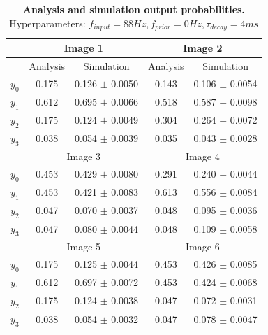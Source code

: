 \begin{table}[]
\centering
\label{tab:1D_88_0_4}
\small
\tabcolsep=0.11cm
\begin{tabular}{|c|cc|cc|}
\hline
                       & \multicolumn{2}{c|}{Image 1}                       & \multicolumn{2}{c|}{Image 2}                       \\ \hline
                       & \multicolumn{1}{c|}{Analysis} & Simulation         & \multicolumn{1}{c|}{Analysis} & Simulation         \\ \hline
$y_0$                  & \multicolumn{1}{c|}{0.175}    & 0.126 $\pm$ 0.0050 & \multicolumn{1}{c|}{0.143}    & 0.106 $\pm$ 0.0054 \\ \hline
$y_1$                  & \multicolumn{1}{c|}{0.612}    & 0.695 $\pm$ 0.0066 & \multicolumn{1}{c|}{0.518}    & 0.587 $\pm$ 0.0098 \\ \hline
$y_2$                  & \multicolumn{1}{c|}{0.175}    & 0.124 $\pm$ 0.0049 & \multicolumn{1}{c|}{0.304}    & 0.264 $\pm$ 0.0072 \\ \hline
$y_3$                  & \multicolumn{1}{c|}{0.038}    & 0.054 $\pm$ 0.0039 & \multicolumn{1}{c|}{0.035}    & 0.043 $\pm$ 0.0028 \\ \hline
                       & \multicolumn{2}{c|}{Image 3}                       & \multicolumn{2}{c|}{Image 4}                       \\ \hline
$y_0$                  & \multicolumn{1}{c|}{0.453}    & 0.429 $\pm$ 0.0080 & \multicolumn{1}{c|}{0.291}    & 0.240 $\pm$ 0.0044 \\ \hline
$y_1$                  & \multicolumn{1}{c|}{0.453}    & 0.421 $\pm$ 0.0083 & \multicolumn{1}{c|}{0.613}    & 0.556 $\pm$ 0.0084 \\ \hline
$y_2$                  & \multicolumn{1}{c|}{0.047}    & 0.070 $\pm$ 0.0037 & \multicolumn{1}{c|}{0.048}    & 0.095 $\pm$ 0.0036 \\ \hline
$y_3$                  & \multicolumn{1}{c|}{0.047}    & 0.080 $\pm$ 0.0044 & \multicolumn{1}{c|}{0.048}    & 0.109 $\pm$ 0.0058 \\ \hline
						& \multicolumn{2}{c|}{Image 5}                       & \multicolumn{2}{c|}{Image 6}                       \\ \hline
$y_0$                  & \multicolumn{1}{c|}{0.175}    & 0.125 $\pm$ 0.0044 & \multicolumn{1}{c|}{0.453}    & 0.426 $\pm$ 0.0085 \\ \hline
$y_1$                  & \multicolumn{1}{c|}{0.612}    & 0.697 $\pm$ 0.0072 & \multicolumn{1}{c|}{0.453}    & 0.424 $\pm$ 0.0068 \\ \hline
$y_2$                  & \multicolumn{1}{c|}{0.175}    & 0.124 $\pm$ 0.0038 & \multicolumn{1}{c|}{0.047}    & 0.072 $\pm$ 0.0031 \\ \hline
$y_3$                  & \multicolumn{1}{c|}{0.038}    & 0.054 $\pm$ 0.0032 & \multicolumn{1}{c|}{0.047}    & 0.078 $\pm$ 0.0047 \\ \hline
\end{tabular}
\caption{\textbf{Analysis and simulation output probabilities. } Hyperparameters: $f_{input} = 88 Hz, f_{prior} = 0 Hz, \tau_{decay} = 4 ms$}
\end{table}

